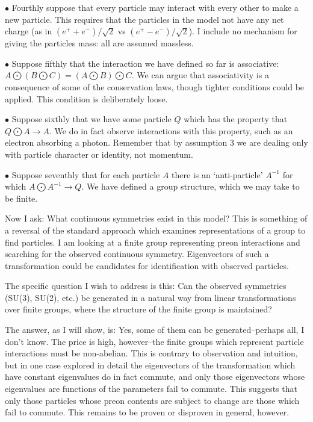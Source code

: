 \documentclass[12pt]{article}
\begin{document}
 $\bullet$  Fourthly suppose that every particle may interact with every other
to make a new particle.  This requires that the particles in the model
not have any net charge (as in $(e^+ +e^-)/\sqrt{2}$ vs
$(e^+ -e^-)/\sqrt{2}$).  I include no mechanism for giving the particles
mass:  all are assumed massless.


 $\bullet$  Suppose fifthly that the interaction we have defined so far is
associative: $A \bigodot (B \bigodot C) = (A \bigodot B) \bigodot C$.
We can argue that
associativity is a consequence of some of the conservation
laws, though tighter conditions could be applied.  This condition
is deliberately loose.

 $\bullet$  Suppose sixthly that we have some particle $Q$ which has the property
that $Q \bigodot A \rightarrow A$.  We do in fact observe interactions
with this property, such as an electron absorbing a photon.
Remember that by assumption 3 we are dealing only
with particle character or identity, not momentum.

 $\bullet$  Suppose seventhly that for each particle $A$ there is an `anti-particle'
$A^{-1}$ for which $A \bigodot A^{-1} \rightarrow Q$.
We have defined a group structure, which we may take to be finite.

  Now I ask:  What continuous symmetries exist in this model?  This is
something of a reversal of the standard approach which examines
representations of a group to find particles.  I am looking at a finite
group representing preon interactions and searching for the observed
continuous symmetry.  Eigenvectors of such a transformation could be
candidates for identification with observed particles.

 The specific question I wish to address is this:  Can the observed
symmetries (SU(3), SU(2), etc.) be generated in a natural way from
linear transformations over finite groups, where the structure of
the finite group is maintained?

 The answer, as I will show, is:  Yes, some of them can be
generated--perhaps all, I don't know.  The price is high, however--the 
finite groups which represent particle interactions
must be non-abelian.  This is contrary to observation and intuition, but
in one case explored in detail the eigenvectors of the
transformation which have constant
eigenvalues do in fact commute, and only those eigenvectors whose
eigenvalues are functions of the parameters fail to commute.  This
suggests that only
those particles whose preon contents are subject to change are those
which fail to commute.  This remains to be proven or disproven in general,
however.
\end{document}
